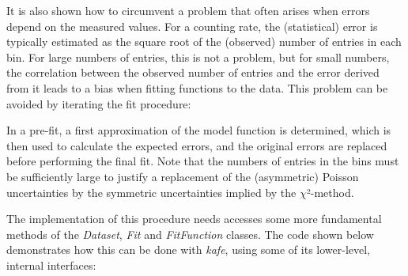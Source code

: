 \documentclass[a4paper,10pt,english]{sphinxmanual}
\begin{document}
It is also shown how to circumvent a problem that
often arises when errors depend on the measured values.
For a counting rate, the (statistical) error is typically estimated
as the square root of the (observed) number of entries in each bin.
For large numbers of entries, this is not a problem,
but for small numbers, the correlation between the observed
number of entries and the error derived from it leads to a
bias when fitting functions to the data. This problem can be
avoided by iterating the fit procedure:

In a pre-fit, a first approximation of the model function is
determined, which is then used to calculate
the expected errors, and the original errors are
replaced before performing the final fit. Note that the numbers
of entries in the bins must be sufficiently large to justify
a replacement of the (asymmetric) Poisson uncertainties by
the symmetric uncertainties implied by the \(\chi\)²-method.

The implementation of this  procedure needs accesses some
more fundamental methods of the \emph{Dataset}, \emph{Fit} and
\emph{FitFunction} classes. The code shown below demonstrates
how this can be done with \emph{kafe}, using some of its lower-level,
internal interfaces:
\end{document}
